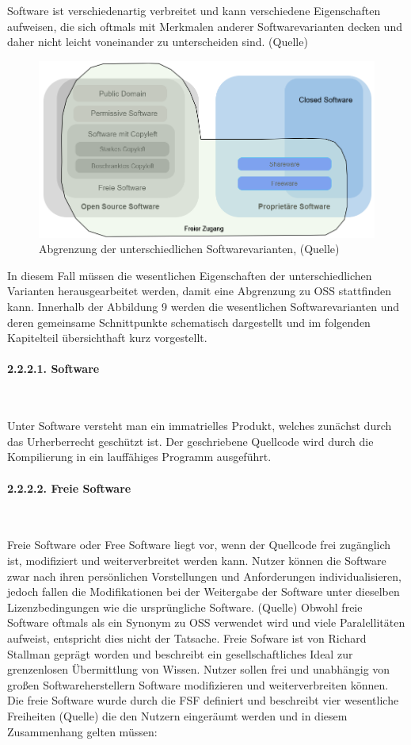 Software ist verschiedenartig verbreitet und kann verschiedene Eigenschaften aufweisen, die sich oftmals mit Merkmalen anderer Softwarevarianten decken und daher nicht leicht voneinander zu unterscheiden sind. (Quelle) 

\begin{figure}[h]
    \centering
    \includegraphics[scale=0.6]{Bilder/AbgrenzungSWvarianten.png}
    \caption{Abgrenzung der unterschiedlichen Softwarevarianten, (Quelle)}
\end{figure}

In diesem Fall müssen die wesentlichen Eigenschaften der unterschiedlichen Varianten herausgearbeitet werden, damit eine Abgrenzung zu OSS stattfinden kann. Innerhalb der Abbildung 9 werden die wesentlichen Softwarevarianten und deren gemeinsame Schnittpunkte schematisch dargestellt und im folgenden Kapitelteil übersichthaft kurz vorgestellt. 

\paragraph{2.2.2.1. Software} $~$

Unter Software versteht man ein immatrielles Produkt, welches zunächst durch das Urherberrecht geschützt ist. Der geschriebene Quellcode wird durch die Kompilierung in ein lauffähiges Programm ausgeführt.

\paragraph{2.2.2.2. Freie Software}$~$

Freie Software oder Free Software liegt vor, wenn der Quellcode frei zugänglich ist, modifiziert und weiterverbreitet werden kann. Nutzer können die Software zwar nach ihren persönlichen Vorstellungen und Anforderungen individualisieren, jedoch fallen die Modifikationen bei der Weitergabe der Software unter dieselben Lizenzbedingungen wie die ursprüngliche Software. (Quelle) Obwohl freie Software oftmals als ein Synonym zu OSS verwendet wird und viele Paralellitäten aufweist, entspricht dies nicht der Tatsache. Freie Sofware ist von Richard Stallman geprägt worden und beschreibt ein gesellschaftliches Ideal zur grenzenlosen Übermittlung von Wissen. \cite[S. 5]{wichmann_linux-_2005} Nutzer sollen frei und unabhängig von großen Softwareherstellern Software modifizieren und weiterverbreiten können. Die freie Software wurde durch die FSF definiert und beschreibt vier wesentliche Freiheiten (Quelle) die den Nutzern eingeräumt werden und in diesem Zusammenhang gelten müssen: 

